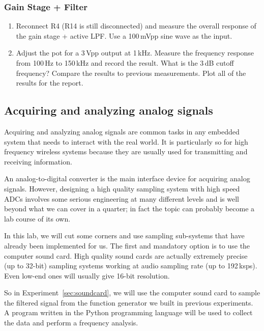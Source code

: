 \documentclass[letterpaper, 11pt]{article}
\begin{document}


\subsubsection{Gain Stage + Filter}
\begin{enumerate}
	\item Reconnect R4 (R14 is still disconnected) and measure the overall response of the gain stage + active LPF. Use a 100\,mVpp sine wave as the input. 
	
	\item Adjust the pot for a 3\,Vpp output at 1\,kHz. Measure the frequency response from 100\,Hz to 150\,kHz and record the result. What is the 3\,dB cutoff frequency? Compare the results to previous measurements. Plot all of the results for the report.

\end{enumerate}


\subsection{Acquiring and analyzing analog signals}
\label{sec:adc}

Acquiring and analyzing analog signals are common tasks in any embedded system that needs to interact with the real world. It is particularly so for high frequency wireless systems because they are usually used for transmitting and receiving information. 

An analog-to-digital converter is the main interface device for acquiring analog signals. However, designing a high quality sampling system with high speed ADCs involves some serious engineering at many different levels and is well beyond what we can cover in a quarter; in fact the topic can probably become a lab course of its own. 

In this lab, we will cut some corners and use sampling sub-systems that have already been implemented for us. The first and mandatory option is to use the computer sound card. High quality sound cards are actually extremely precise (up to 32-bit) sampling systems working at audio sampling rate (up to 192\,ksps). Even low-end ones will usually give 16-bit resolution.

So in Experiment~\ref{sec:soundcard}, we will use the computer sound card to sample the filtered signal from the function generator we built in previous experiments. A program written in the Python programming language will be used to collect the data and perform a frequency analysis. 
\end{document}
